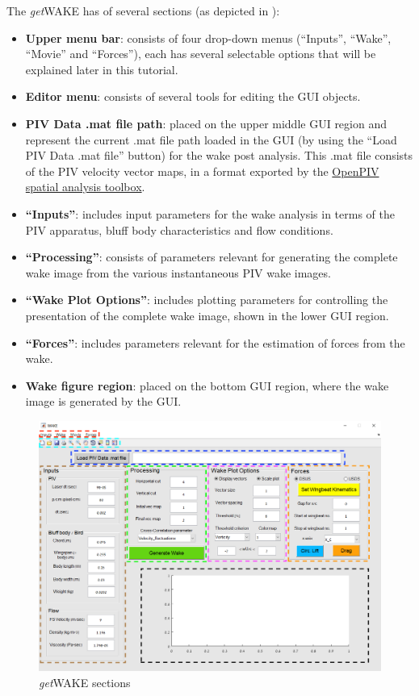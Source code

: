 \documentclass[12pt,a4paper]{article}
\begin{document}
The \textit{get}WAKE has of several sections (as depicted in ):
\begin{itemize}
\item {\color{red}\textbf{Upper menu bar}}: consists of four drop-down menus (``Inputs'', ``Wake'', ``Movie'' and ``Forces''), each has several selectable options that will be explained later in this tutorial.
\item {\color{cyan}\textbf{Editor menu}}: consists of several tools for editing the GUI objects.
\item {\color{blue}\textbf{PIV Data .mat file path}}: placed on the upper middle GUI region and represent the current .mat file path loaded in the GUI (by using the ``Load PIV Data .mat file'' button) for the wake post analysis. This .mat file consists of the PIV velocity vector maps, in a format exported by the \href{https://github.com/OpenPIV/openpiv-spatial-analysis-toolbox}{OpenPIV spatial analysis toolbox}.
\item {\color{brown}\textbf{``Inputs''}}: includes input parameters for the wake analysis in terms of the PIV apparatus, bluff body characteristics and flow conditions.
\item {\color{green}\textbf{``Processing''}}: consists of parameters relevant for generating the complete wake image from the various instantaneous PIV wake images.
\item {\color{magenta}\textbf{``Wake Plot Options''}}: includes plotting parameters for controlling the presentation of the complete wake image, shown in the lower GUI region.
\item {\color{orange}\textbf{``Forces''}}: includes parameters relevant for the estimation of forces from the wake.
\item {\color{black}\textbf{Wake figure region}}: placed on the bottom GUI region, where the wake image is generated by the GUI.
\end{itemize}

\begin{figure}[ht!]
	\centering
	\includegraphics[width=\textwidth]{openwindow-marked}
	\caption{\textit{get}WAKE sections}
	\label{fig:GUI-sections}
\end{figure}	
\end{document}
